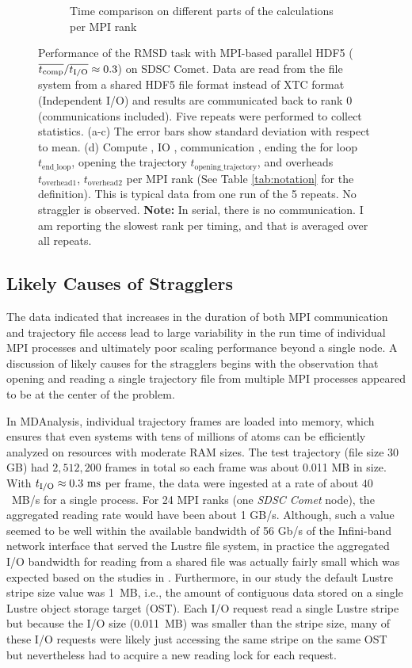 \begin{figure}[ht!]
\begin{subfigure} {.5\textwidth}
  \caption{Time comparison on different parts of the calculations per MPI rank}
  \label{fig:MPIranks-hdf5}
\end{subfigure}
%
\caption{Performance of the RMSD task with MPI-based parallel HDF5 ($\overline{{t}_{\text{comp}}}/\overline{{t}_{\text{I/O}}} \approx 0.3$) on SDSC Comet.
Data are read from the file system from a shared HDF5 file format instead of XTC format (Independent I/O) and results are communicated back to rank 0 (communications included). 
Five repeats were performed to collect statistics. (a-c) The error bars show standard deviation with respect to mean. (d) Compute \tcomp, IO \tIO, communication \tcomm, ending the for loop $t_{\text{end\_loop}}$,
  opening the trajectory $t_{\text{opening\_trajectory}}$, and overheads $t_{\text{overhead1}}$, $t_{\text{overhead2}}$ per MPI rank (See Table \ref{tab:notation} for the definition).
  This is typical data from one run of the 5 repeats. No straggler is observed. \textbf{Note:} In serial, there is no communication. I am reporting the slowest rank per timing, and that is averaged over all repeats.}
\label{fig:MPIwithIO-hdf5}
\end{figure}

\subsection{Likely Causes of Stragglers}
\label{sec:likelycauses}
The data indicated that increases in the duration of both MPI communication and trajectory file access lead to large variability in the run time of individual MPI processes and ultimately poor scaling performance beyond a single node.
A discussion of likely causes for the stragglers begins with the observation that opening and reading a single trajectory file from multiple MPI processes appeared to be at the center of the problem. 

In MDAnalysis, individual trajectory frames are loaded into memory, which ensures that even systems with tens of millions of atoms can be efficiently analyzed on resources with moderate RAM sizes.
The test trajectory (file size 30 GB) had $2,512,200$ frames in total so each frame was about 0.011 MB in size.
With ${t}_{\text{I/O}} \approx 0.3~\text{ms}$ per frame, the data were ingested at a rate of about $40$~MB/s for a single process.
For 24 MPI ranks (one \emph{SDSC Comet} node), the aggregated reading rate would have been about 1 GB/s.
Although, such a value seemed to be well within the available bandwidth of 56 Gb/s of the Infini-band network interface that served the Lustre file system, in practice the aggregated I/O bandwidth for reading from a shared file was actually fairly small which was expected based on the studies in \cite{ATPESC2016}.
Furthermore, in our study the default Lustre stripe size value was 1~MB, i.e., the amount of contiguous data stored on a single Lustre object storage target (OST).
Each I/O request read a single Lustre stripe but because the I/O size (0.011~MB) was smaller than the stripe size, many of these I/O requests were likely just accessing the same stripe on the same OST but nevertheless had to acquire a new reading lock for each request.

